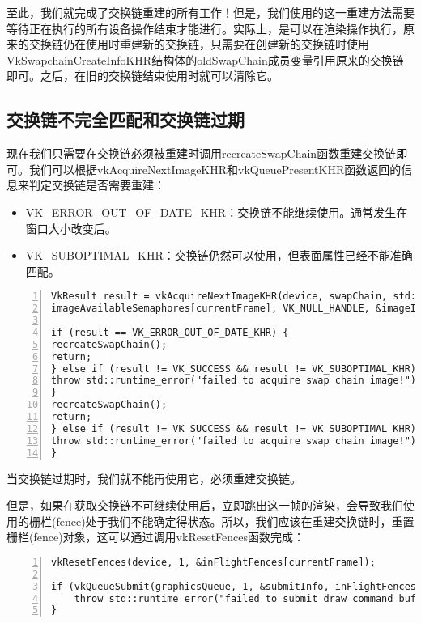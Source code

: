 \documentclass{ctexart}
\begin{document}
至此，我们就完成了交换链重建的所有工作！但是，我们使用的这一重建方法需要等待正在执行的所有设备操作结束才能进行。实际上，是可以在渲染操作执行，原来的交换链仍在使用时重建新的交换链，只需要在创建新的交换链时使用VkSwapchainCreateInfoKHR结构体的oldSwapChain成员变量引用原来的交换链即可。之后，在旧的交换链结束使用时就可以清除它。

\subsection{交换链不完全匹配和交换链过期}

现在我们只需要在交换链必须被重建时调用recreateSwapChain函数重建交换链即可。我们可以根据vkAcquireNextImageKHR和vkQueuePresentKHR函数返回的信息来判定交换链是否需要重建：

\begin{itemize}
	\item VK\_ERROR\_OUT\_OF\_DATE\_KHR：交换链不能继续使用。通常发生在窗口大小改变后。
	\item VK\_SUBOPTIMAL\_KHR：交换链仍然可以使用，但表面属性已经不能准确匹配。
\end{itemize}

\begin{lstlisting}[language={[ANSI]C},keywordstyle=\color{blue!70},commentstyle=\color{red!50!green!50!blue!50},frame=shadowbox, rulesepcolor=\color{red!20!green!20!blue!20},basicstyle=\small,numbers=left, numberstyle=\tiny,breaklines=true]
VkResult result = vkAcquireNextImageKHR(device, swapChain, std::numeric_limits<uint64_t>::max(),
imageAvailableSemaphores[currentFrame], VK_NULL_HANDLE, &imageIndex);

if (result == VK_ERROR_OUT_OF_DATE_KHR) {
recreateSwapChain();
return;
} else if (result != VK_SUCCESS && result != VK_SUBOPTIMAL_KHR) {
throw std::runtime_error("failed to acquire swap chain image!");
}
recreateSwapChain();
return;
} else if (result != VK_SUCCESS && result != VK_SUBOPTIMAL_KHR) {
throw std::runtime_error("failed to acquire swap chain image!");
}
\end{lstlisting}

当交换链过期时，我们就不能再使用它，必须重建交换链。

但是，如果在获取交换链不可继续使用后，立即跳出这一帧的渲染，会导致我们使用的栅栏(fence)处于我们不能确定得状态。所以，我们应该在重建交换链时，重置栅栏(fence)对象，这可以通过调用vkResetFences函数完成：

\begin{lstlisting}[language={[ANSI]C},keywordstyle=\color{blue!70},commentstyle=\color{red!50!green!50!blue!50},frame=shadowbox, rulesepcolor=\color{red!20!green!20!blue!20},basicstyle=\small,numbers=left, numberstyle=\tiny,breaklines=true]
vkResetFences(device, 1, &inFlightFences[currentFrame]);

if (vkQueueSubmit(graphicsQueue, 1, &submitInfo, inFlightFences[currentFrame]) != VK_SUCCESS) {
	throw std::runtime_error("failed to submit draw command buffer!");
}
\end{lstlisting}
\end{document}
